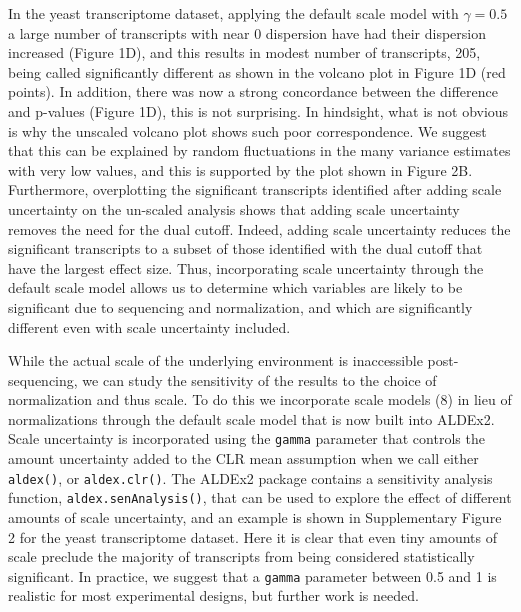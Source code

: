 \documentclass[
]{article}
\begin{document}
In the yeast transcriptome dataset, applying the default scale model
with \(\gamma=0.5\) a large number of transcripts with near 0 dispersion
have had their dispersion increased (Figure 1D), and this results in
modest number of transcripts, 205, being called significantly different
as shown in the volcano plot in Figure 1D (red points). In addition,
there was now a strong concordance between the difference and p-values
(Figure 1D), this is not surprising. In hindsight, what is not obvious
is why the unscaled volcano plot shows such poor correspondence. We
suggest that this can be explained by random fluctuations in the many
variance estimates with very low values, and this is supported by the
plot shown in Figure 2B. Furthermore, overplotting the significant
transcripts identified after adding scale uncertainty on the un-scaled
analysis shows that adding scale uncertainty removes the need for the
dual cutoff. Indeed, adding scale uncertainty reduces the significant
transcripts to a subset of those identified with the dual cutoff that
have the largest effect size. Thus, incorporating scale uncertainty
through the default scale model allows us to determine which variables
are likely to be significant due to sequencing and normalization, and
which are significantly different even with scale uncertainty included.

While the actual scale of the underlying environment is inaccessible
post-sequencing, we can study the sensitivity of the results to the
choice of normalization and thus scale. To do this we incorporate scale
models (8) in lieu of normalizations through the default scale model
that is now built into ALDEx2. Scale uncertainty is incorporated using
the \texttt{gamma} parameter that controls the amount uncertainty added
to the CLR mean assumption when we call either \texttt{aldex()}, or
\texttt{aldex.clr()}. The ALDEx2 package contains a sensitivity analysis
function, \texttt{aldex.senAnalysis()}, that can be used to explore the
effect of different amounts of scale uncertainty, and an example is
shown in Supplementary Figure 2 for the yeast transcriptome dataset.
Here it is clear that even tiny amounts of scale preclude the majority
of transcripts from being considered statistically significant. In
practice, we suggest that a \texttt{gamma} parameter between 0.5 and 1
is realistic for most experimental designs, but further work is needed.
\end{document}
